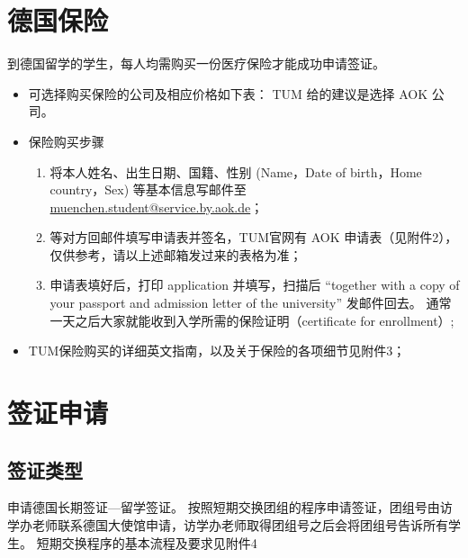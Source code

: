 \documentclass[oneside,final]{book}
\begin{document}
\chapter{德国保险}
到德国留学的学生，每人均需购买一份医疗保险才能成功申请签证。%
\begin{itemize}
\item 可选择购买保险的公司及相应价格如下表：%
TUM 给的建议是选择 AOK 公司。
\item 保险购买步骤
\begin{enumerate}
\item 将本人姓名、出生日期、国籍、性别 (Name，Date of birth，Home country，Sex) 等基本信息写邮件至 \sloppy \href{mailto:muenchen.student@service.by.aok.de}{muenchen.student@service.by.aok.de}；%
\item 等对方回邮件填写申请表并签名，TUM官网有 AOK 申请表（见附件2），仅供参考，请以上述邮箱发过来的表格为准；
\item 申请表填好后，打印 application 并填写，扫描后 ``together with a copy of your passport and admission letter of the university'' 发邮件回去。%
通常一天之后大家就能收到入学所需的保险证明（certificate for enrollment）;
\end{enumerate}
\item TUM保险购买的详细英文指南，以及关于保险的各项细节见附件3；
\end{itemize}

\chapter{签证申请}
\section{签证类型}
申请德国长期签证---留学签证。 
按照短期交换团组的程序申请签证，团组号由访学办老师联系德国大使馆申请，访学办老师取得团组号之后会将团组号告诉所有学生。
短期交换程序的基本流程及要求见附件4
\end{document}
